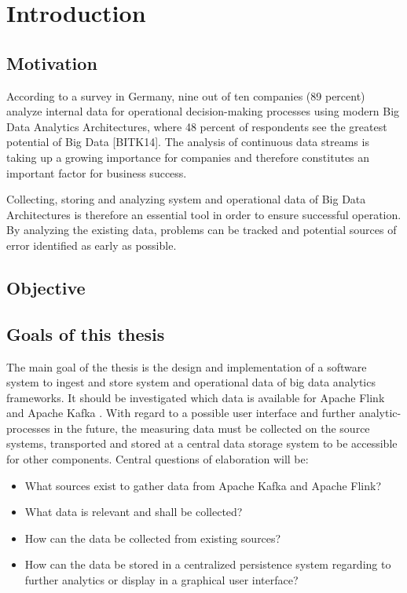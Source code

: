 \chapter{Introduction}
\section{Motivation}
According to a survey in Germany, nine out of ten companies (89 percent) analyze internal data for operational decision-making processes using modern Big Data Analytics Architectures, where 48 percent of respondents see the greatest potential of Big Data [BITK14]. The analysis of continuous data streams is taking up a growing importance for companies and therefore constitutes an important factor for business success.

Collecting, storing and analyzing system and operational data of Big Data Architectures is therefore an essential tool in order to ensure successful operation. By analyzing the existing data, problems can be tracked and potential sources of error identified as early as possible.
\section{Objective}

\section{Goals of this thesis}

The main goal of the thesis is the design and implementation of a software system to ingest and  store system and operational data of big data analytics frameworks. It should be investigated which data is available for Apache Flink and Apache Kafka . With regard to a possible user interface and further analytic-processes in the future, the measuring data must be collected on the source systems, transported and stored at a central data storage system to be accessible for other components.
Central questions of elaboration will be:

\begin{itemize}
\item What sources exist to gather data from Apache Kafka and Apache Flink?
\item What data is relevant and shall be collected?
\item How can the data be collected from existing sources?
\item How can the data be stored in a centralized persistence system regarding to further analytics or display in a graphical user interface?
\end{itemize}
